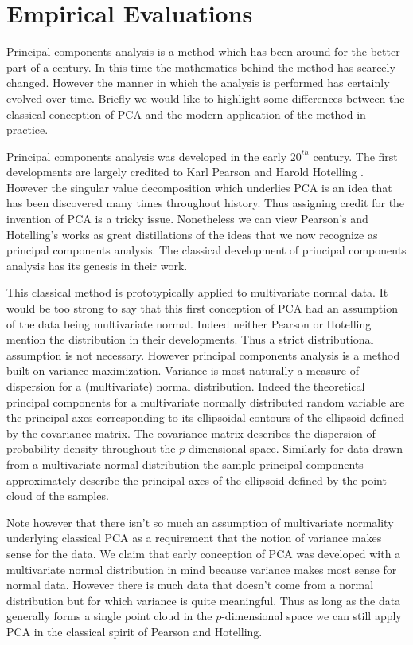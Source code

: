 \documentclass{book}
\begin{document}
\chapter{Empirical Evaluations}

Principal components analysis is a method which has been around for the better part of a century. In this time the mathematics behind the method has scarcely changed. However the manner in which the analysis is performed has certainly evolved over time. Briefly we would like to highlight some differences between the classical conception of PCA and the modern application of the method in practice.  

Principal components analysis was developed in the early $20^{th}$ century. The first developments are largely credited to Karl Pearson and Harold Hotelling \cite{pearson,hotelling}. However the singular value decomposition which underlies PCA is an idea that has been discovered many times throughout history. Thus assigning credit for the invention of PCA is a tricky issue. Nonetheless we can view Pearson's and Hotelling's works as great distillations of the ideas that we now recognize as principal components analysis. The classical development of principal components analysis has its genesis in their work. 

This classical method is prototypically applied to multivariate normal data.  It would be too strong to say that this first conception of PCA had an assumption of the data being multivariate normal. Indeed neither Pearson or Hotelling mention the distribution in their developments. Thus a strict distributional assumption is not necessary. However principal components analysis is a method built on variance maximization. Variance is most naturally a measure of dispersion for a (multivariate) normal distribution. Indeed the theoretical principal components for a multivariate normally distributed random variable are the principal axes corresponding to its ellipsoidal contours of the ellipsoid defined by the covariance matrix. The covariance matrix describes the dispersion of probability density throughout the $p$-dimensional space. Similarly for data drawn from a multivariate normal distribution the sample principal components approximately describe the principal axes of the ellipsoid defined by the point-cloud of the samples. 

Note however that there isn't so much an assumption of multivariate normality underlying classical PCA as a requirement that the notion of variance makes sense for the data. We claim that early conception of PCA was developed with a multivariate normal distribution in mind because variance makes most sense for normal data. However there is much data that doesn't come from a normal distribution but for which variance is quite meaningful. Thus as long as the data generally forms a single point cloud in the $p$-dimensional space we can still apply PCA in the classical spirit of Pearson and Hotelling. 
\end{document}
